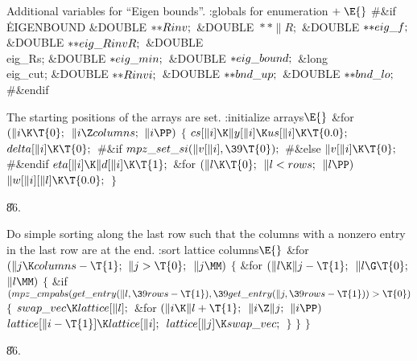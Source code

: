 Additional variables for ``Eigen bounds''.
\Y\B\4:globals for enumeration\X${}\mathrel+\E{}$\6
\8\#\&{if} \.{EIGENBOUND}\6
\&{DOUBLE} ${}{*}{*}\\{Rinv};{}$\6
\&{DOUBLE} ${}{*}{*}\|R;{}$\6
\&{DOUBLE} ${}{*}{*}\\{eig\_f};{}$\6
\&{DOUBLE} ${}{*}{*}\\{eig\_RinvR};{}$\6
\&{DOUBLE} \\{eig\_Rs};\6
\&{DOUBLE} ${}{*}\\{eig\_min};{}$\6
\&{DOUBLE} ${}{*}\\{eig\_bound};{}$\6
\&{long} \\{eig\_cut};\6
\&{DOUBLE} ${}{*}{*}\\{Rinvi};{}$\6
\&{DOUBLE} ${}{*}{*}\\{bnd\_up};{}$\6
\&{DOUBLE} ${}{*}{*}\\{bnd\_lo};{}$\6
\8\#\&{endif}\par
\fi

   The starting positions of the arrays are set.
\Y\B\4:initialize arrays\X${}\E{}$\6
\&{for} ${}(\|i\K\T{0};{}$ ${}\|i\Z\\{columns};{}$ ${}\|i\PP){}$\5
${}\{{}$\1\6
${}\\{cs}[\|i]\K\|y[\|i]\K\\{us}[\|i]\K\T{0.0};{}$\6
${}\\{delta}[\|i]\K\T{0};{}$\6
\8\#\&{if} \6
${}\\{mpz\_set\_si}(\|v[\|i],\39\T{0});{}$\6
\8\#\&{else}\6
${}\|v[\|i]\K\T{0};{}$\6
\8\#\&{endif}\6
${}\\{eta}[\|i]\K\|d[\|i]\K\T{1};{}$\6
\&{for} ${}(\|l\K\T{0};{}$ ${}\|l<\\{rows};{}$ ${}\|l\PP){}$\1\5
${}\|w[\|i][\|l]\K\T{0.0};{}$\2\6
\4${}\}{}$\2\par
\U86.\fi

Do simple sorting along the last row such that the
columns with a nonzero entry in the last row are
at the end.
\Y\B\4:sort lattice columns\X${}\E{}$\6
\&{for} ${}(\|j\K\\{columns}-\T{1};{}$ ${}\|j>\T{0};{}$ ${}\|j\MM){}$\5
${}\{{}$\1\6
\&{for} ${}(\|l\K\|j-\T{1};{}$ ${}\|l\G\T{0};{}$ ${}\|l\MM){}$\5
${}\{{}$\1\6
\&{if} ${}(\\{mpz\_cmpabs}(\\{get\_entry}(\|l,\39\\{rows}-\T{1}),\39\\{get%
\_entry}(\|j,\39\\{rows}-\T{1}))>\T{0}){}$\5
${}\{{}$\1\6
${}\\{swap\_vec}\K\\{lattice}[\|l];{}$\6
\&{for} ${}(\|i\K\|l+\T{1};{}$ ${}\|i\Z\|j;{}$ ${}\|i\PP){}$\1\5
${}\\{lattice}[\|i-\T{1}]\K\\{lattice}[\|i];{}$\2\6
${}\\{lattice}[\|j]\K\\{swap\_vec};{}$\6
\4${}\}{}$\2\6
\4${}\}{}$\2\6
\4${}\}{}$\2\par
\U86.\fi


